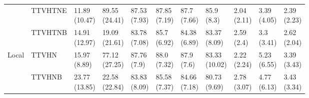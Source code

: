 \begin{table}
\begin{tabular}{lllllllllll}
       & TTVHTNE &  \makecell{11.89\\(10.47)} &  \makecell{89.55\\(24.41)} &   \makecell{87.53\\(7.93)} &  \makecell{87.85\\(7.19)} &   \makecell{87.7\\(7.66)} &     \makecell{85.9\\(8.3)} &      \makecell{2.04\\(2.11)} &  \makecell{3.39\\(4.05)} &  \makecell{2.39\\(2.23)} \\
       & TTVHTNB &  \makecell{14.91\\(12.97)} &  \makecell{19.09\\(21.61)} &   \makecell{83.78\\(7.08)} &   \makecell{85.7\\(6.92)} &  \makecell{84.38\\(6.89)} &   \makecell{83.37\\(8.09)} &       \makecell{2.59\\(2.4)} &   \makecell{3.3\\(3.41)} &  \makecell{2.62\\(2.04)} \\
Local & TTVHN &   \makecell{15.97\\(8.89)} &  \makecell{77.12\\(27.25)} &    \makecell{87.76\\(7.9)} &   \makecell{88.0\\(7.32)} &    \makecell{87.9\\(7.6)} &  \makecell{83.33\\(10.02)} &      \makecell{2.22\\(2.24)} &  \makecell{5.23\\(6.55)} &  \makecell{3.39\\(3.43)} \\
       & TTVHNB &  \makecell{23.77\\(13.85)} &  \makecell{22.58\\(22.84)} &   \makecell{83.83\\(8.09)} &  \makecell{85.58\\(7.37)} &  \makecell{84.66\\(7.18)} &   \makecell{80.73\\(9.69)} &      \makecell{2.78\\(3.07)} &  \makecell{4.77\\(6.13)} &  \makecell{3.43\\(3.34)} \\

\end{tabular}
\end{table}

